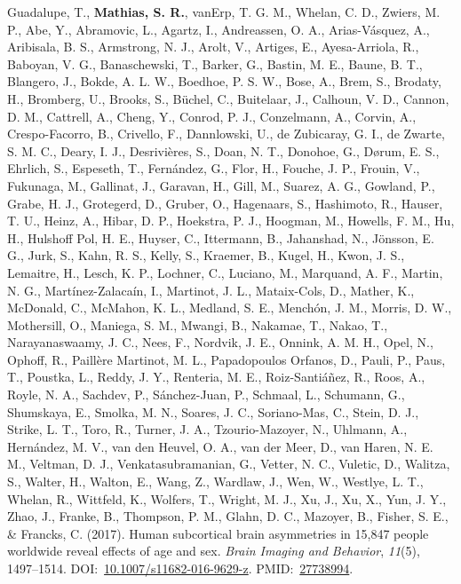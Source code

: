 \documentclass[10pt]{article}
\makeatletter
\newlength{\bibhang}
\newlength{\bibsep}
 {\@listi \global\bibsep\itemsep \global\advance\bibsep by\parsep}
\newenvironment{bibsection}%
        {\vspace{-\baselineskip}\begin{list}{}{%
       \setlength{\leftmargin}{\bibhang}%
       \setlength{\itemindent}{-\leftmargin}%
       \setlength{\itemsep}{\bibsep}%
       \setlength{\parsep}{\z@}%
        \setlength{\partopsep}{0pt}%
        \setlength{\topsep}{0pt}}}
        {\end{list}\vspace{-.6\baselineskip}}
\makeatother
\begin{document}
\begin{bibsection}
\item Guadalupe, T., \textbf{Mathias, S. R.}, vanErp, T. G. M., Whelan, C. D., Zwiers, M. P., Abe, Y., Abramovic, L., Agartz, I., Andreassen, O. A., Arias-Vásquez, A., Aribisala, B. S., Armstrong, N. J., Arolt, V., Artiges, E., Ayesa-Arriola, R., Baboyan, V. G., Banaschewski, T., Barker, G., Bastin, M. E., Baune, B. T., Blangero, J., Bokde, A. L. W., Boedhoe, P. S. W., Bose, A., Brem, S., Brodaty, H., Bromberg, U., Brooks, S., Büchel, C., Buitelaar, J., Calhoun, V. D., Cannon, D. M., Cattrell, A., Cheng, Y., Conrod, P. J., Conzelmann, A., Corvin, A., Crespo-Facorro, B., Crivello, F., Dannlowski, U., de Zubicaray, G. I., de Zwarte, S. M. C., Deary, I. J., Desrivières, S., Doan, N. T., Donohoe, G., Dørum, E. S., Ehrlich, S., Espeseth, T., Fernández, G., Flor, H., Fouche, J. P., Frouin, V., Fukunaga, M., Gallinat, J., Garavan, H., Gill, M., Suarez, A. G., Gowland, P., Grabe, H. J., Grotegerd, D., Gruber, O., Hagenaars, S., Hashimoto, R., Hauser, T. U., Heinz, A., Hibar, D. P., Hoekstra, P. J., Hoogman, M., Howells, F. M., Hu, H., Hulshoff Pol, H. E., Huyser, C., Ittermann, B., Jahanshad, N., Jönsson, E. G., Jurk, S., Kahn, R. S., Kelly, S., Kraemer, B., Kugel, H., Kwon, J. S., Lemaitre, H., Lesch, K. P., Lochner, C., Luciano, M., Marquand, A. F., Martin, N. G., Martínez-Zalacaín, I., Martinot, J. L., Mataix-Cols, D., Mather, K., McDonald, C., McMahon, K. L., Medland, S. E., Menchón, J. M., Morris, D. W., Mothersill, O., Maniega, S. M., Mwangi, B., Nakamae, T., Nakao, T., Narayanaswaamy, J. C., Nees, F., Nordvik, J. E., Onnink, A. M. H., Opel, N., Ophoff, R., Paillère Martinot, M. L., Papadopoulos Orfanos, D., Pauli, P., Paus, T., Poustka, L., Reddy, J. Y., Renteria, M. E., Roiz-Santiáñez, R., Roos, A., Royle, N. A., Sachdev, P., Sánchez-Juan, P., Schmaal, L., Schumann, G., Shumskaya, E., Smolka, M. N., Soares, J. C., Soriano-Mas, C., Stein, D. J., Strike, L. T., Toro, R., Turner, J. A., Tzourio-Mazoyer, N., Uhlmann, A., Hernández, M. V., van den Heuvel, O. A., van der Meer, D., van Haren, N. E. M., Veltman, D. J., Venkatasubramanian, G., Vetter, N. C., Vuletic, D., Walitza, S., Walter, H., Walton, E., Wang, Z., Wardlaw, J., Wen, W., Westlye, L. T., Whelan, R., Wittfeld, K., Wolfers, T., Wright, M. J., Xu, J., Xu, X., Yun, J. Y., Zhao, J., Franke, B., Thompson, P. M., Glahn, D. C., Mazoyer, B., Fisher, S. E., \& Francks, C. (2017). Human subcortical brain asymmetries in 15,847 people worldwide reveal effects of age and sex. \emph{Brain Imaging and Behavior}, \emph{11}(5), 1497--1514. DOI:~\href{https://doi.org/10.1007/s11682-016-9629-z}{10.1007/s11682-016-9629-z}. PMID:~\href{https://www.ncbi.nlm.nih.gov/pubmed/?term=27738994}{27738994}.

\end{bibsection}
\end{document}
